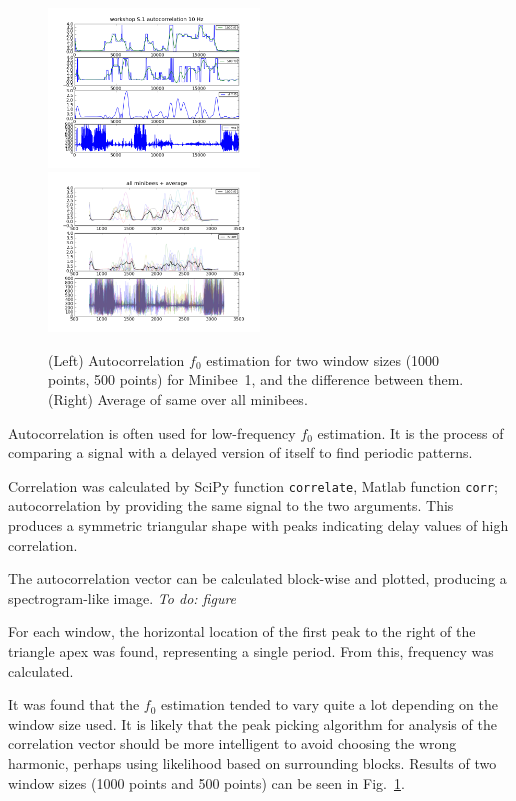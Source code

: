 \documentclass{article}
\newcommand{\todo}[1]{\emph{To do: #1}}
\newcommand{\func}[1]{\texttt{#1}}
\begin{document}
\begin{figure}
\includegraphics[width=0.5\textwidth]{images/workshop_autocorr_10hz_m1.png}
\includegraphics[width=0.5\textwidth]{images/workshop_all_autocorr_f0_10hz.png}
\caption{(Left) Autocorrelation $f_0$ estimation for two window sizes
  (1000 points, 500 points) for Minibee~1, and the difference between
  them.  (Right) Average of same over all minibees.}
\label{autof0}
\end{figure}

Autocorrelation is often used for low-frequency $f_0$ estimation.
It is the process of comparing a signal with a delayed version of
itself to find periodic patterns.

Correlation was calculated by SciPy function \func{correlate}, Matlab
function \func{corr}; autocorrelation by providing the same signal to
the two arguments.
This produces a symmetric triangular shape with peaks indicating delay
values of high correlation.

The autocorrelation vector can be calculated block-wise and plotted,
producing a spectrogram-like image. \todo{figure}

For each window, the horizontal location of the first peak to the
right of the triangle apex was found, representing a single period.
From this, frequency was calculated.

It was found that the $f_0$ estimation tended to vary quite a lot
depending on the window size used.
It is likely that the peak picking algorithm for analysis of the
correlation vector should be more intelligent to avoid choosing the
wrong harmonic, perhaps using likelihood based on surrounding blocks.
Results of two window sizes (1000 points and 500 points) can be seen
in Fig.~\ref{autof0}.
\end{document}
